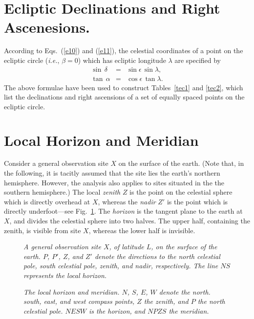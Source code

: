 \section{Ecliptic Declinations and Right Ascenesions.}
According to Eqs.~(\ref{e10}) and (\ref{e11}), the celestial coordinates of a point on the ecliptic circle ({\em i.e.}, $\beta = 0$) which has ecliptic
longitude $\lambda$ are specified by
\begin{eqnarray}\label{e15q}
\sin\,\delta &=& \sin\epsilon\,\sin\lambda,\\[0.5ex]
\tan\,\alpha&=&  \cos\epsilon\,\tan\lambda.\label{e15r}
\end{eqnarray}
The above formulae have been used to construct
Tables~\ref{tec1} and \ref{tec2}, which  list the declinations and right ascensions of a set of equally spaced points on the ecliptic circle.

\section{Local Horizon and Meridian}
Consider a general observation site $X$ on the surface of the earth. (Note that, in the following, it is
tacitly assumed that the site lies the earth's northern hemisphere. However, the analysis also
applies to sites situated in the the southern hemisphere.)
The local {\em zenith}\/ $Z$ is the point on the celestial sphere which is directly overhead at $X$,
whereas the {\em nadir}\/ $Z'$ is the point which is directly underfoot---see Fig.~\ref{f5}. The {\em horizon}\/
is the tangent plane to the earth at $X$, and divides the celestial sphere into two halves. The upper half,
containing the zenith, is visible from site $X$, whereas the lower half is invisible. 

\begin{figure}
\epsfysize=3in
\centerline{}
\caption[{\em A general observation site on the earth's surface.}]{\em A general observation site $X$, of latitude $L$,  on the surface of the earth. $P$, $P'$, $Z$, and $Z'$
denote the directions to the north celestial pole, south celestial pole, zenith, and nadir, respectively. The line
$NS$ represents the local horizon.}\label{f5}
\end{figure}

\begin{figure}
\epsfysize=3in
\centerline{}
\caption[{\em The local horizon and meridian.}]{\em The local horizon and meridian. $N$, $S$, $E$, $W$
denote the north. south, east, and west compass points, $Z$ the
zenith, and $P$ the north celestial pole. $NESW$ is the horizon, and
$NPZS$ the meridian.}\label{f6}
\end{figure}

